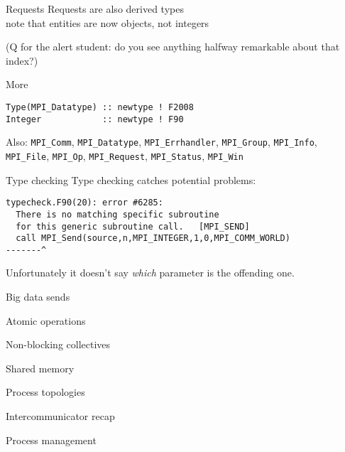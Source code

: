 \documentclass[11pt,headernav]{beamer}
\begin{document}
\begin{numberedframe}{Requests}
  Requests are also derived types\\
  note that  entities are now objects, not integers


  (Q for the alert student: do you see anything halfway
  remarkable about that index?)
\end{numberedframe}

\begin{numberedframe}{More}
\begin{lstlisting}
Type(MPI_Datatype) :: newtype ! F2008
Integer            :: newtype ! F90
\end{lstlisting}

Also:
  \lstinline{MPI_Comm}, \lstinline{MPI_Datatype},
  \lstinline{MPI_Errhandler}, \lstinline{MPI_Group},
  \lstinline{MPI_Info}, \lstinline{MPI_File}, \lstinline{MPI_Op},
  \lstinline{MPI_Request}, \lstinline{MPI_Status}, \lstinline{MPI_Win}
\end{numberedframe}

\begin{numberedframe}{Type checking}
  Type checking catches potential problems:
\begin{verbatim}
typecheck.F90(20): error #6285: 
  There is no matching specific subroutine
  for this generic subroutine call.   [MPI_SEND]
  call MPI_Send(source,n,MPI_INTEGER,1,0,MPI_COMM_WORLD)
-------^
\end{verbatim}
Unfortunately it doesn't say \emph{which} parameter is the offending one.
\end{numberedframe}

\lstset{language=C}

 {Big data sends}


 {Atomic operations}

%
 
 {Non-blocking collectives}


 {Shared memory}


 {Process topologies}


 {Intercommunicator recap}





 {Process management}

\end{document}
